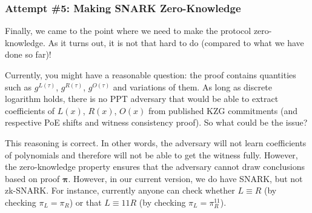 \documentclass[../lecture-notes.tex]{subfiles}
\begin{document}
\subsubsection{Attempt \#5: Making SNARK Zero-Knowledge}

Finally, we came to the point where we need to make the protocol zero-knowledge. As it turns out, it is not that hard to do (compared to what we have done so far)!

\begin{remark}
    Currently, you might have a reasonable question: the proof contains quantities such as $g^{L(\tau)}$, $g^{R(\tau)}$, $g^{O(\tau)}$ and variations of them. As long as discrete logarithm holds, there is no PPT adversary that would be able to extract coefficients of $L(x)$, $R(x)$, $O(x)$ from published KZG commitments (and respective PoE shifts and witness consistency proof). So what could be the issue?

    This reasoning is correct. In other words, the adversary will not learn coefficients of polynomials and therefore will not be able to get the witness fully. However, the zero-knowledge property ensures that the adversary cannot draw conclusions based on proof $\boldsymbol{\pi}$. However, in our current version, we do have SNARK, but not zk-SNARK. For instance, currently anyone can check whether $L \equiv R$ (by checking $\pi_L = \pi_R$) or that $L \equiv 11R$ (by checking $\pi_L = \pi_R^{11}$).  
\end{remark}
\end{document}
